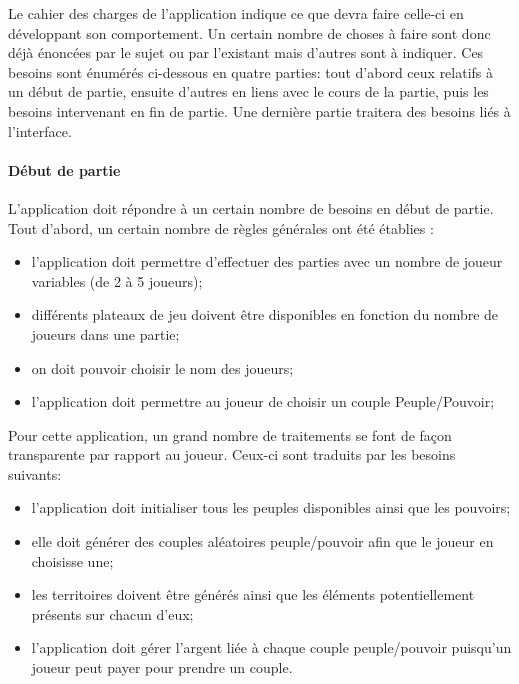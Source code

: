 \documentclass[a4paper, 11pt]{article}
\begin{document}
		Le cahier des charges de l'application indique ce que devra faire celle-ci en développant son comportement. Un certain nombre de choses à faire sont donc déjà énoncées par le sujet ou par l'existant mais d'autres sont à indiquer. Ces besoins sont énumérés ci-dessous en quatre parties: tout d'abord ceux relatifs à un début de partie, ensuite d'autres en liens avec le cours de la partie, puis les besoins intervenant en fin de partie. Une dernière partie traitera des besoins liés à l'interface.
		
			\paragraph{Début de partie\\}
			
			L'application doit répondre à un certain nombre de besoins en début de partie. \\
			
			Tout d'abord, un certain nombre de règles générales ont été établies :
			\begin{itemize}
				\item l'application doit permettre d'effectuer des parties avec un nombre de joueur variables (de 2 à 5 joueurs);
				\item différents plateaux de jeu doivent être disponibles en fonction du nombre de joueurs dans une partie;
				\item on doit pouvoir choisir le nom des joueurs;
				\item l'application doit permettre au joueur de choisir un couple Peuple/Pouvoir; \\
			\end{itemize}
			
			Pour cette application, un grand nombre de traitements se font de façon transparente par rapport au joueur. Ceux-ci sont traduits par les besoins suivants:
			\begin{itemize}
				\item l'application doit initialiser tous les peuples disponibles ainsi que les pouvoirs;
				\item elle doit générer des couples aléatoires peuple/pouvoir afin que le joueur en choisisse une;
				\item les territoires doivent être générés ainsi que les éléments potentiellement présents sur chacun d'eux;
				\item l'application doit gérer l'argent liée à chaque couple peuple/pouvoir puisqu'un joueur peut payer pour prendre un couple.
			\end{itemize}
			
\end{document}

